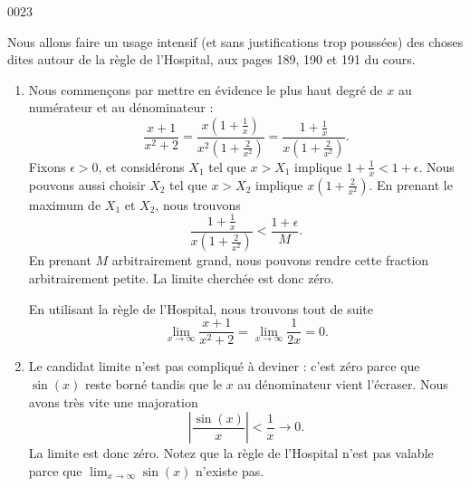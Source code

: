 
\begin{corrige}{0023}

Nous allons faire un usage intensif (et sans justifications trop poussées) des choses dites autour de la règle de l'Hospital, aux pages 189, 190 et 191 du cours.

\begin{enumerate}

\item
 Nous commençons par mettre en évidence le plus haut degré de $x$ au numérateur et au dénominateur :
\begin{equation}
	\frac{ x+1 }{ x^2+2 }=\frac{ x\left( 1+\frac{1}{ x } \right) }{ x^2\left( 1+\frac{ 2 }{ x^2 } \right) }=\frac{ 1+\frac{1}{ x } }{ x\left( 1+\frac{ 2 }{ x^2 } \right) }.
\end{equation}
Fixons $\epsilon>0$, et considérons $X_1$ tel que $x>X_1$ implique $1+\frac{1}{ x }<1+\epsilon$. Nous pouvons aussi choisir $X_2$ tel que $x>X_2$ implique $x\left( 1+\frac{ 2 }{ x^2 } \right)$. En prenant le maximum de $X_1$ et $X_2$, nous trouvons
\begin{equation}
\frac{ 1+\frac{1}{ x } }{ x\left( 1+\frac{ 2 }{ x^2 } \right) }<\frac{ 1+\epsilon }{ M }.
\end{equation}
En prenant $M$ arbitrairement grand, nous pouvons rendre cette fraction arbitrairement petite. La limite cherchée est donc zéro.

\begin{alternative}
En utilisant la règle de l'Hospital, nous trouvons tout de suite
\begin{equation}
	\lim_{x\to\infty}\frac{ x+1 }{ x^2+2 }=\lim_{x\to\infty}\frac{ 1 }{ 2x }=0.
\end{equation}
\end{alternative}

\item
Le candidat limite n'est pas compliqué à deviner : c'est zéro parce que $\sin(x)$ reste borné tandis que le $x$ au dénominateur vient l'écraser. Nous avons très vite une majoration
\begin{equation}
	\left| \frac{ \sin(x)}{ x } \right| <\frac{1}{ x }\to 0.
\end{equation}
La limite est donc zéro. Notez que la règle de l'Hospital n'est pas valable parce que $\lim_{x\to\infty}\sin(x)$ n'existe pas.


\end{enumerate}
\end{corrige}

